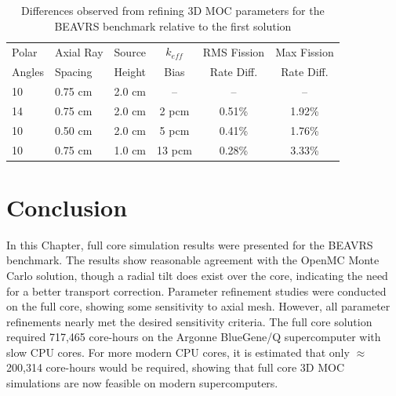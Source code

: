 \begin{table}[ht]
	\centering
	\caption{Differences observed from refining 3D MOC parameters for the BEAVRS benchmark relative to the first solution}
	\medskip
	\begin{tabular}{l|l|l|c|c|c}
		\hline
		Polar  & Axial Ray & Source & $k_{\textit{eff}}$  & RMS Fission & Max Fission \\
		Angles & Spacing   & Height & Bias                & Rate Diff. & Rate Diff. \\
		\hline
		10 & 0.75 cm & 2.0 cm & --     & --     & --  \\
		14 & 0.75 cm & 2.0 cm & 2 pcm  & 0.51\% & 1.92\%  \\
		10 & 0.50 cm & 2.0 cm & 5 pcm  & 0.41\% & 1.76\%  \\
		10 & 0.75 cm & 1.0 cm & 13 pcm & 0.28\% & 3.33\%  \\
		\hline
	\end{tabular}
	\label{tab:fc-param-sensitivity}
\end{table}

\section{Conclusion}
\label{sec:fc-conclusion}

In this Chapter, full core simulation results were presented for the BEAVRS benchmark. The results show reasonable agreement with the OpenMC Monte Carlo solution, though a radial tilt does exist over the core, indicating the need for a better transport correction. Parameter refinement studies were conducted on the full core, showing some sensitivity to axial mesh. However, all parameter refinements nearly met the desired sensitivity criteria. The full core solution required 717,465 core-hours on the Argonne BlueGene/Q supercomputer with slow CPU cores. For more modern CPU cores, it is estimated that only $\approx$ 200,314 core-hours would be required, showing that full core 3D \ac{MOC} simulations are now feasible on modern supercomputers.


